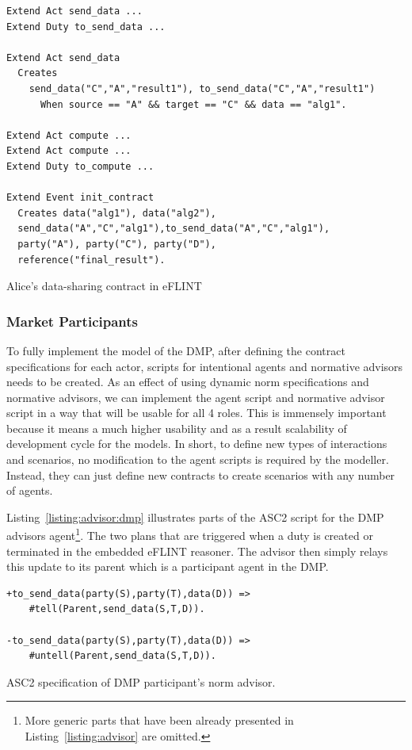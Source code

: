 \begin{listing}[h]
\centering
\begin{tcolorbox}[left=2pt,right=2pt,top=2pt,bottom=2pt]
\begin{verbatim}
Extend Act send_data ...
Extend Duty to_send_data ...

Extend Act send_data
  Creates 
    send_data("C","A","result1"), to_send_data("C","A","result1")
      When source == "A" && target == "C" && data == "alg1".

Extend Act compute ...
Extend Act compute ...
Extend Duty to_compute ...

Extend Event init_contract
  Creates data("alg1"), data("alg2"),
  send_data("A","C","alg1"),to_send_data("A","C","alg1"),
  party("A"), party("C"), party("D"),
  reference("final_result").
\end{verbatim}
\end{tcolorbox}
\caption{Alice's data-sharing contract in eFLINT}
\label{listing:eflint:dmp-alice}
\end{listing}

\subsubsection{Market Participants}
To fully implement the model of the DMP, after defining the contract specifications for each actor, scripts for intentional agents and normative advisors needs to be created. As an effect of using dynamic norm specifications and normative advisors, we can implement the agent script and normative advisor script in a way that will be usable for all 4 roles. This is immensely important because it means a much higher usability and as a result scalability of development cycle for the models. In short, to define new types of interactions and scenarios, no modification to the agent scripts is required by the modeller. Instead, they can just define new contracts to create scenarios with any number of agents. 


Listing~\ref{listing:advisor:dmp} illustrates parts of the ASC2 script for the DMP advisors agent\footnote{More generic parts that have been already presented in Listing~\ref{listing:advisor} are omitted.}. The two plans that are triggered when a duty  is created or terminated in the embedded eFLINT reasoner. The advisor then simply relays this update to its parent which is a participant agent in the DMP.

\begin{listing}[!tbh]
\begin{verbatim}
+to_send_data(party(S),party(T),data(D)) =>
    #tell(Parent,send_data(S,T,D)).

-to_send_data(party(S),party(T),data(D)) =>
    #untell(Parent,send_data(S,T,D)).
\end{verbatim}
\caption{ASC2 specification of DMP participant's norm advisor.}
\label{asc:advisor}
\label{listing:advisor:dmp}
\end{listing}

